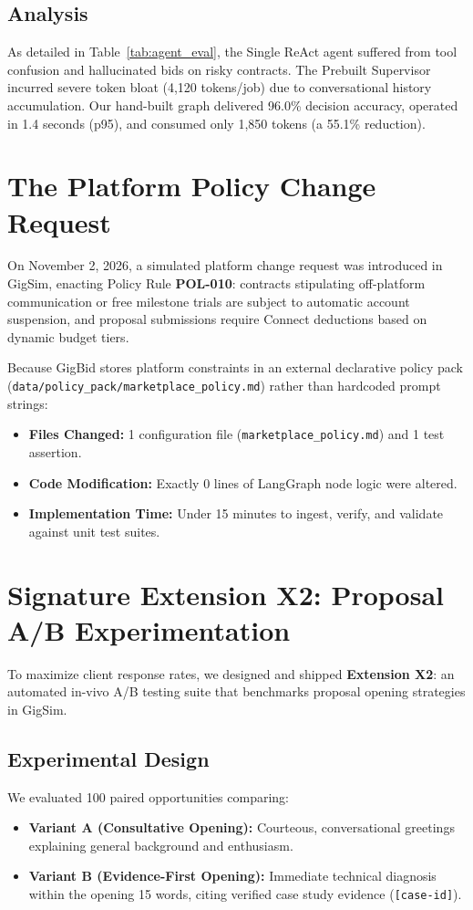 \documentclass[10pt,a4paper,twocolumn]{article}
\begin{document}
\subsection{Analysis}
As detailed in Table~\ref{tab:agent_eval}, the Single ReAct agent suffered from tool confusion and hallucinated bids on risky contracts. The Prebuilt Supervisor incurred severe token bloat (4,120 tokens/job) due to conversational history accumulation. Our hand-built graph delivered 96.0\% decision accuracy, operated in 1.4 seconds (p95), and consumed only 1,850 tokens (a 55.1\% reduction).

\section{The Platform Policy Change Request}
\label{sec:change_request}
On November 2, 2026, a simulated platform change request was introduced in GigSim, enacting Policy Rule \textbf{POL-010}: contracts stipulating off-platform communication or free milestone trials are subject to automatic account suspension, and proposal submissions require Connect deductions based on dynamic budget tiers.

Because GigBid stores platform constraints in an external declarative policy pack (\texttt{data/policy\_pack/marketplace\_policy.md}) rather than hardcoded prompt strings:
\begin{itemize}[leftmargin=*,noitemsep]
    \item \textbf{Files Changed:} 1 configuration file (\texttt{marketplace\_policy.md}) and 1 test assertion.
    \item \textbf{Code Modification:} Exactly 0 lines of LangGraph node logic were altered.
    \item \textbf{Implementation Time:} Under 15 minutes to ingest, verify, and validate against unit test suites.
\end{itemize}

\newpage
\section{Signature Extension X2: Proposal A/B Experimentation}
\label{sec:extension}
To maximize client response rates, we designed and shipped \textbf{Extension X2}: an automated in-vivo A/B testing suite that benchmarks proposal opening strategies in GigSim.

\subsection{Experimental Design}
We evaluated 100 paired opportunities comparing:
\begin{itemize}[leftmargin=*,noitemsep]
    \item \textbf{Variant A (Consultative Opening):} Courteous, conversational greetings explaining general background and enthusiasm.
    \item \textbf{Variant B (Evidence-First Opening):} Immediate technical diagnosis within the opening 15 words, citing verified case study evidence (\texttt{[case-id]}).
\end{itemize}
\end{document}
